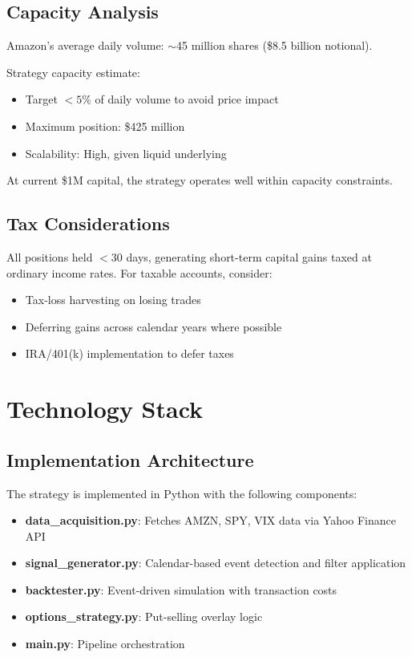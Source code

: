 \documentclass[twocolumn,ieee]{arithmaxresearch}
\begin{document}
\subsection{Capacity Analysis}

Amazon's average daily volume: $\sim$45 million shares (\$8.5 billion notional).

Strategy capacity estimate:
\begin{itemize}
    \item Target $< 5\%$ of daily volume to avoid price impact
    \item Maximum position: \$425 million
    \item Scalability: High, given liquid underlying
\end{itemize}

At current \$1M capital, the strategy operates well within capacity constraints.

\subsection{Tax Considerations}

All positions held $< 30$ days, generating short-term capital gains taxed at ordinary income rates. For taxable accounts, consider:
\begin{itemize}
    \item Tax-loss harvesting on losing trades
    \item Deferring gains across calendar years where possible
    \item IRA/401(k) implementation to defer taxes
\end{itemize}

\section{Technology Stack}

\subsection{Implementation Architecture}

The strategy is implemented in Python with the following components:

\begin{itemize}
    \item \textbf{data\_acquisition.py}: Fetches AMZN, SPY, VIX data via Yahoo Finance API
    \item \textbf{signal\_generator.py}: Calendar-based event detection and filter application
    \item \textbf{backtester.py}: Event-driven simulation with transaction costs
    \item \textbf{options\_strategy.py}: Put-selling overlay logic
    \item \textbf{main.py}: Pipeline orchestration
\end{itemize}
\end{document}
